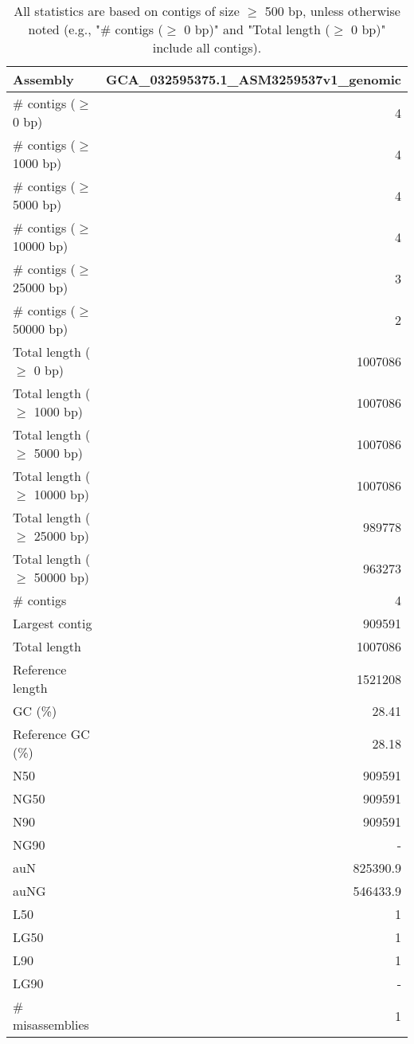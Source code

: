 \documentclass[12pt,a4paper]{article}
\begin{document}
\begin{table}[ht]
\begin{center}
\caption{All statistics are based on contigs of size $\geq$ 500 bp, unless otherwise noted (e.g., "\# contigs ($\geq$ 0 bp)" and "Total length ($\geq$ 0 bp)" include all contigs).}
\begin{tabular}{|l*{1}{|r}|}
\hline
Assembly & GCA\_032595375.1\_ASM3259537v1\_genomic \\ \hline
\# contigs ($\geq$ 0 bp) & 4 \\ \hline
\# contigs ($\geq$ 1000 bp) & 4 \\ \hline
\# contigs ($\geq$ 5000 bp) & 4 \\ \hline
\# contigs ($\geq$ 10000 bp) & 4 \\ \hline
\# contigs ($\geq$ 25000 bp) & 3 \\ \hline
\# contigs ($\geq$ 50000 bp) & 2 \\ \hline
Total length ($\geq$ 0 bp) & 1007086 \\ \hline
Total length ($\geq$ 1000 bp) & 1007086 \\ \hline
Total length ($\geq$ 5000 bp) & 1007086 \\ \hline
Total length ($\geq$ 10000 bp) & 1007086 \\ \hline
Total length ($\geq$ 25000 bp) & 989778 \\ \hline
Total length ($\geq$ 50000 bp) & 963273 \\ \hline
\# contigs & 4 \\ \hline
Largest contig & 909591 \\ \hline
Total length & 1007086 \\ \hline
Reference length & 1521208 \\ \hline
GC (\%) & 28.41 \\ \hline
Reference GC (\%) & 28.18 \\ \hline
N50 & 909591 \\ \hline
NG50 & 909591 \\ \hline
N90 & 909591 \\ \hline
NG90 & - \\ \hline
auN & 825390.9 \\ \hline
auNG & 546433.9 \\ \hline
L50 & 1 \\ \hline
LG50 & 1 \\ \hline
L90 & 1 \\ \hline
LG90 & - \\ \hline
\# misassemblies & 1 \\ \hline

\end{tabular}
\end{center}
\end{table}
\end{document}
